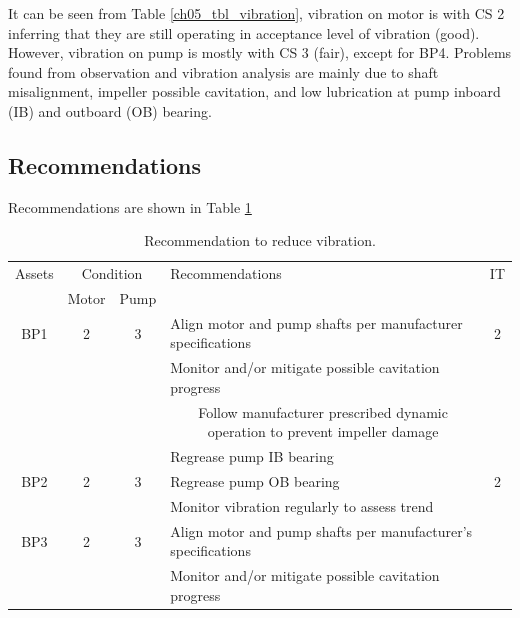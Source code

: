 It can be seen from Table \ref{ch05_tbl_vibration}, vibration on motor is with CS 2 inferring that they are still operating in acceptance level of vibration (good). However, vibration on pump is mostly with CS 3 (fair), except for BP4. Problems found from observation and vibration analysis are mainly due to shaft misalignment, impeller possible cavitation, and low lubrication at pump inboard (IB) and outboard (OB) bearing. 

\subsection{Recommendations}
Recommendations are shown in Table \ref{ch05_tbl_vibrationre}

\begin{table}[!h]
	\caption{Recommendation to reduce vibration.}
	\label{ch05_tbl_vibrationre}
	{\footnotesize
		\begin{tabular}{l|l|l|l|c}
\hline
\multicolumn{1}{c|}{Assets} & \multicolumn{2}{c|}{Condition} & Recommendations & IT \\ 
\cline{2-3}
\multicolumn{1}{c|}{} & \multicolumn{1}{c|}{Motor} & \multicolumn{1}{c|}{Pump} & \multicolumn{1}{c|}{} &  \\ 
\hline
\multicolumn{1}{c|}{BP1} & \multicolumn{1}{c|}{2} & \multicolumn{1}{c|}{3} & Align motor and pump shafts per manufacturer specifications & 2 \\ 
\multicolumn{1}{c|}{} & \multicolumn{1}{c|}{} & \multicolumn{1}{c|}{} & Monitor and/or mitigate possible cavitation progress &  \\ 
\multicolumn{1}{c|}{} & \multicolumn{1}{c|}{} & \multicolumn{1}{c|}{} & \multicolumn{1}{c|}{Follow manufacturer prescribed dynamic operation to prevent impeller damage} &  \\ 
\multicolumn{1}{c|}{} & \multicolumn{1}{c|}{} & \multicolumn{1}{c|}{} & Regrease pump IB bearing &  \\ 
\hline
\multicolumn{1}{c|}{BP2} & \multicolumn{1}{c|}{2} & \multicolumn{1}{c|}{3} & Regrease pump OB bearing & 2 \\ 
\multicolumn{1}{c|}{} & \multicolumn{1}{c|}{} & \multicolumn{1}{c|}{} & Monitor vibration regularly to assess trend &  \\ 
\hline
\multicolumn{1}{c|}{BP3} & \multicolumn{1}{c|}{2} & \multicolumn{1}{c|}{3} & Align motor and pump shafts per manufacturer's specifications &  \\ 
\multicolumn{1}{c|}{} & \multicolumn{1}{c|}{} & \multicolumn{1}{c|}{} & Monitor and/or mitigate possible cavitation progress &  \\ 

\end{tabular}}
\end{table}
